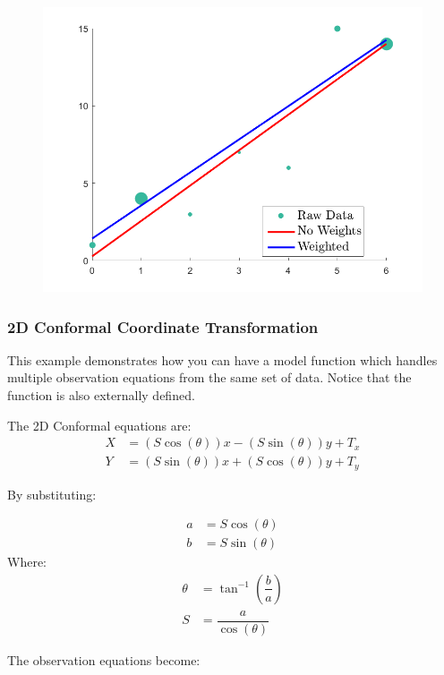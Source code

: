 \documentclass{article}
\begin{document}
	\begin{figure}[H]
		\centering
		\includegraphics[width = \linewidth]{weights}
	\end{figure}
	
	\clearpage
	\subsubsection*{2D Conformal Coordinate Transformation}
	This example demonstrates how you can have a model function which handles multiple observation equations from the same set of data.  Notice that the function is also externally defined.
	
	\vspace{0.25cm}
	\noindent
	The 2D Conformal equations are:
	\begin{align*}
	X &= (S\cos(\theta))x - (S\sin(\theta))y + T_x \\
	Y &= (S\sin(\theta))x + (S\cos(\theta))y + T_y
	\end{align*}
	
	\noindent
	By substituting: 
	
	\begin{align*}
	a &= S\cos(\theta) \\
	b &= S\sin(\theta)
	\end{align*}
	Where:
	\begin{align*}
	\theta &= \tan^{-1}(\dfrac{b}{a}) \\
	S &= \dfrac{a}{\cos(\theta)}
	\end{align*}
	
	\noindent
	The observation equations become:
	
\end{document}

